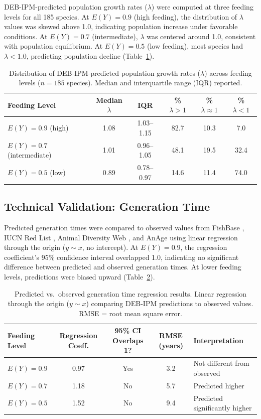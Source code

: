 \documentclass[11pt]{article}
\begin{document}
DEB-IPM-predicted population growth rates ($\lambda$) were computed at three feeding levels for all 185 species. At $E(Y) = 0.9$ (high feeding), the distribution of $\lambda$ values was skewed above 1.0, indicating population increase under favorable conditions. At $E(Y) = 0.7$ (intermediate), $\lambda$ was centered around 1.0, consistent with population equilibrium. At $E(Y) = 0.5$ (low feeding), most species had $\lambda < 1.0$, predicting population decline (Table~\ref{tab:lambda}).

\begin{table}[H]
\centering
\caption{Distribution of DEB-IPM-predicted population growth rates ($\lambda$) across feeding levels ($n = 185$ species). Median and interquartile range (IQR) reported.}
\label{tab:lambda}
\begin{tabular}{lccccc}
\toprule
\textbf{Feeding Level} & \textbf{Median $\lambda$} & \textbf{IQR} & \textbf{\% $\lambda > 1$} & \textbf{\% $\lambda \approx 1$} & \textbf{\% $\lambda < 1$} \\
\midrule
$E(Y) = 0.9$ (high) & 1.08 & 1.03--1.15 & 82.7 & 10.3 & 7.0 \\
$E(Y) = 0.7$ (intermediate) & 1.01 & 0.96--1.05 & 48.1 & 19.5 & 32.4 \\
$E(Y) = 0.5$ (low) & 0.89 & 0.78--0.97 & 14.6 & 11.4 & 74.0 \\
\bottomrule
\end{tabular}
\end{table}

\subsection{Technical Validation: Generation Time}

Predicted generation times were compared to observed values from FishBase \citep{froese2023fishbase}, IUCN Red List \citep{iucn2023red}, Animal Diversity Web \citep{myer2000animal}, and AnAge \citep{tacutu2018human} using linear regression through the origin ($y \sim x$, no intercept). At $E(Y) = 0.9$, the regression coefficient's 95\% confidence interval overlapped 1.0, indicating no significant difference between predicted and observed generation times. At lower feeding levels, predictions were biased upward (Table~\ref{tab:gentime}).

\begin{table}[H]
\centering
\caption{Predicted vs.\ observed generation time regression results. Linear regression through the origin ($y \sim x$) comparing DEB-IPM predictions to observed values. RMSE = root mean square error.}
\label{tab:gentime}
\begin{tabular}{lcccl}
\toprule
\textbf{Feeding Level} & \textbf{Regression Coeff.} & \textbf{95\% CI Overlaps 1?} & \textbf{RMSE (years)} & \textbf{Interpretation} \\
\midrule
$E(Y) = 0.9$ & 0.97 & Yes & 3.2 & Not different from observed \\
$E(Y) = 0.7$ & 1.18 & No & 5.7 & Predicted higher \\
$E(Y) = 0.5$ & 1.52 & No & 9.4 & Predicted significantly higher \\
\bottomrule
\end{tabular}
\end{table}
\end{document}
